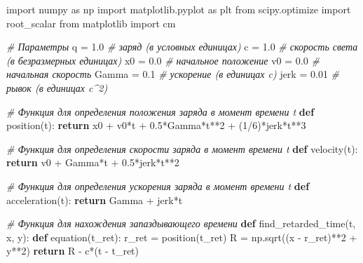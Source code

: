 \documentclass[11pt]{article}
\newenvironment{Shaded}{}{}
\newcommand{\KeywordTok}[1]{\textcolor[rgb]{0.00,0.44,0.13}{\textbf{{#1}}}}
\newcommand{\DecValTok}[1]{\textcolor[rgb]{0.25,0.63,0.44}{{#1}}}
\newcommand{\FloatTok}[1]{\textcolor[rgb]{0.25,0.63,0.44}{{#1}}}
\newcommand{\CommentTok}[1]{\textcolor[rgb]{0.38,0.63,0.69}{\textit{{#1}}}}
\newcommand{\NormalTok}[1]{{#1}}
\newcommand{\ImportTok}[1]{{#1}}
\newcommand{\ControlFlowTok}[1]{\textcolor[rgb]{0.00,0.44,0.13}{\textbf{{#1}}}}
\newcommand{\OperatorTok}[1]{\textcolor[rgb]{0.40,0.40,0.40}{{#1}}}
\begin{document}
\begin{Shaded}
\begin{Highlighting}[]
\ImportTok{import}\NormalTok{ numpy }\ImportTok{as}\NormalTok{ np}
\ImportTok{import}\NormalTok{ matplotlib.pyplot }\ImportTok{as}\NormalTok{ plt}
\ImportTok{from}\NormalTok{ scipy.optimize }\ImportTok{import}\NormalTok{ root_scalar}
\ImportTok{from}\NormalTok{ matplotlib }\ImportTok{import}\NormalTok{ cm}

\CommentTok{# Параметры}
\NormalTok{q }\OperatorTok{=} \FloatTok{1.0}  \CommentTok{# заряд (в условных единицах)}
\NormalTok{c }\OperatorTok{=} \FloatTok{1.0}  \CommentTok{# скорость света (в безразмерных единицах)}
\NormalTok{x0 }\OperatorTok{=} \FloatTok{0.0}  \CommentTok{# начальное положение}
\NormalTok{v0 }\OperatorTok{=} \FloatTok{0.0}  \CommentTok{# начальная скорость}
\NormalTok{Gamma }\OperatorTok{=} \FloatTok{0.1}  \CommentTok{# ускорение (в единицах c)}
\NormalTok{jerk }\OperatorTok{=} \FloatTok{0.01}  \CommentTok{# рывок (в единицах c^2)}

\CommentTok{# Функция для определения положения заряда в момент времени t}
\KeywordTok{def}\NormalTok{ position(t):}
    \ControlFlowTok{return}\NormalTok{ x0 }\OperatorTok{+}\NormalTok{ v0}\OperatorTok{*}\NormalTok{t }\OperatorTok{+} \FloatTok{0.5}\OperatorTok{*}\NormalTok{Gamma}\OperatorTok{*}\NormalTok{t}\OperatorTok{**}\DecValTok{2} \OperatorTok{+}\NormalTok{ (}\DecValTok{1}\OperatorTok{/}\DecValTok{6}\NormalTok{)}\OperatorTok{*}\NormalTok{jerk}\OperatorTok{*}\NormalTok{t}\OperatorTok{**}\DecValTok{3}

\CommentTok{# Функция для определения скорости заряда в момент времени t}
\KeywordTok{def}\NormalTok{ velocity(t):}
    \ControlFlowTok{return}\NormalTok{ v0 }\OperatorTok{+}\NormalTok{ Gamma}\OperatorTok{*}\NormalTok{t }\OperatorTok{+} \FloatTok{0.5}\OperatorTok{*}\NormalTok{jerk}\OperatorTok{*}\NormalTok{t}\OperatorTok{**}\DecValTok{2}

\CommentTok{# Функция для определения ускорения заряда в момент времени t}
\KeywordTok{def}\NormalTok{ acceleration(t):}
    \ControlFlowTok{return}\NormalTok{ Gamma }\OperatorTok{+}\NormalTok{ jerk}\OperatorTok{*}\NormalTok{t}

\CommentTok{# Функция для нахождения запаздывающего времени}
\KeywordTok{def}\NormalTok{ find_retarded_time(t, x, y):}
    \KeywordTok{def}\NormalTok{ equation(t_ret):}
\NormalTok{        r_ret }\OperatorTok{=}\NormalTok{ position(t_ret)}
\NormalTok{        R }\OperatorTok{=}\NormalTok{ np.sqrt((x }\OperatorTok{-}\NormalTok{ r_ret)}\OperatorTok{**}\DecValTok{2} \OperatorTok{+}\NormalTok{ y}\OperatorTok{**}\DecValTok{2}\NormalTok{)}
        \ControlFlowTok{return}\NormalTok{ R }\OperatorTok{-}\NormalTok{ c}\OperatorTok{*}\NormalTok{(t }\OperatorTok{-}\NormalTok{ t_ret)}


\end{Highlighting}
\end{Shaded}
\end{document}
